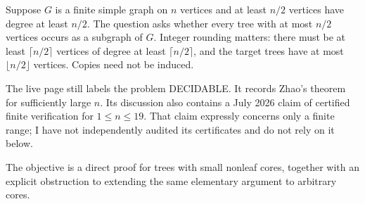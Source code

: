 Suppose $G$ is a finite simple graph on $n$ vertices and at least $n/2$ vertices have degree at least $n/2$. The question asks whether every tree with at most $n/2$ vertices occurs as a subgraph of $G$. Integer rounding matters: there must be at least $\lceil n/2\rceil$ vertices of degree at least $\lceil n/2\rceil$, and the target trees have at most $\lfloor n/2\rfloor$ vertices. Copies need not be induced.

The live page still labels the problem DECIDABLE. It records Zhao's theorem for sufficiently large $n$. Its discussion also contains a July 2026 claim of certified finite verification for $1\le n\le19$. That claim expressly concerns only a finite range; I have not independently audited its certificates and do not rely on it below.

The objective is a direct proof for trees with small nonleaf cores, together with an explicit obstruction to extending the same elementary argument to arbitrary cores.
